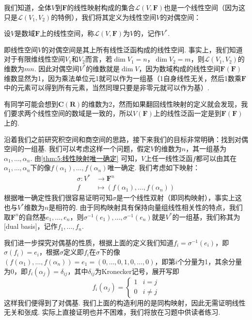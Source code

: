 我们知道，全体$V$到$\mathbf{F}$的线性映射构成的集合$\mathcal{L}(V,\mathbf{F})$也是一个线性空间（因为这只是$\mathcal{L}(V_1,V_2)$的特例），我们将其定义为线性空间$V$的对偶空间：
\begin{definition}
    设$V$是数域$\mathbf{F}$上的线性空间，称$\mathcal{L}(V,\mathbf{F})$为$V$的，记作$V^*$.
\end{definition}

即线性空间$V$的对偶空间是其上所有线性泛函构成的线性空间. 事实上，我们知道对于有限维线性空间$V_1$和$V_2$而言，若$\dim V_1=n$，$\dim V_2=m$，则$\mathcal{L}(V_1,V_2)$的维数为$mn$. 因此对偶空间$V^*$的维数就是$\dim V$，因为数域构成的线性空间$\mathbf{F}(\mathbf{F})$维数显然为1，因为乘法单位元1就可以作为一组基（1自身线性无关，然后1数乘$\mathbf{F}$中的元素可以得到所有元素，当然同理只要是非零元就可以作为基）.

有同学可能会想到$\mathbf{C}(\mathbf{R})$的维数为2，然而如果翻回线性映射的定义就会发现，我们要求两个线性空间的数域是一致的，所以$V(\mathbf{F})$上的线性泛函一定是到$\mathbf{F}(\mathbf{F})$上的.

沿着我们之前研究积空间和商空间的思路，接下来我们的目标非常明确：找到对偶空间的一组基. 我们可以考虑这样一个问题，假定$V$的维数为$n$，其一组基为$\alpha_1,\ldots,\alpha_n$. 由\autoref{thm:5:线性映射唯一确定} 可知，$V$上任一线性泛函$f$都可以由其在$\alpha_1,\ldots,\alpha_n$下的像$f(\alpha_1),\ldots,f(\alpha_n)$唯一确定. 我们考虑如下映射：
\begin{align*}
    \sigma:V^* & \to\mathbf{F}^n                         \\
    f          & \mapsto(f(\alpha_1),\ldots,f(\alpha_n))
\end{align*}
根据唯一确定性我们很容易证明可知$\sigma$是一个线性双射（即同构映射），事实上这也与$V^*$维数为$n$是相符的. 由于同构映射具有保持向量组线性相关性的特点，我们取$\mathbf{F}^n$的自然基$e_1,\ldots,e_n$，则$\sigma^{-1}(e_1),\ldots,\sigma^{-1}(e_n)$就是$V^*$的一组基，我们称其为[dual basis]，记作$f_1,\ldots,f_n$.

我们进一步探究对偶基的性质，根据上面的定义我们知道$f_i=\sigma^{-1}(e_i)$，即$\sigma(f_i)=e_i$，根据$\sigma$定义即$f_i$在$\sigma$下的像$(f(\alpha_1),\ldots,f(\alpha_n))=e_1=(0,\ldots,0,1,0,\ldots,0)$，即第$i$个分量为1，其余分量为0，即$f_i(\alpha_j)=\delta_{ij}$，其中$\delta_{ij}$为Kronecker记号，展开写即\[f_i(\alpha_j)=\begin{cases}
        1 & i=j     \\
        0 & i\neq j
    \end{cases}\]
这样我们便得到了对偶基. 我们上面的构造利用的是同构映射，因此无需证明线性无关和张成. 实际上直接证明也并不困难，我们将放在习题中供读者练习.

